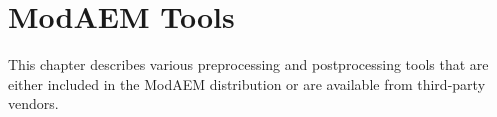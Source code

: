 \chapter{ModAEM Tools }

This chapter describes various preprocessing and postprocessing tools
that are either included in the ModAEM distribution or are available
from third-party vendors.
